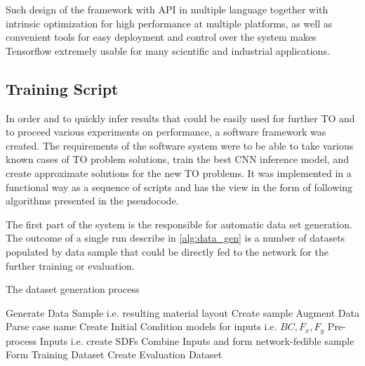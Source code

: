 Such design of the framework with API in multiple language together with intrinsic optimization for high performance at multiple platforms, as well as convenient tools for easy deployment and control over the system makes Tensorflow extremely usable for many scientific and industrial applications.

\subsection{Training Script}

In order and to quickly infer results that could be easily used for further TO and to proceed various experiments on performance, a software framework was created. 
The requirements of the software system were to be able to take various known cases of TO problem solutions, train the best CNN inference model, and create approximate solutions for the new TO problems.
It was implemented in a functional way as a sequence of scripts and has the view in the form of following algorithms presented in the pseudocode. 
\medskip

The first part of the system is the responsible for automatic data set generation.
The outcome of a single run describe in \ref{alg:data_gen} is a number of datasets populated by data sample that could be directly fed to the network for the further training or evaluation.

\begin{algorithm}
\caption{The dataset generation process}\label{alg:data_gen}
\begin{algorithmic}[0]
		\State Generate Data Sample i.e. resulting material layout
		\State Create sample
	\EndFor
		\State Augment Data
		\State Parse case name
		\State Create Initial Condition models for inputs i.e. $ BC,F_x,F_y $
		\State Pre-process Inputs i.e. create SDFs
		\State Combine Inputs and form network-fedible sample
	\EndFor
		\State Form Training Dataset
	\EndFor
	\State Create Evaluation Dataset
\end{algorithmic} 	
\end{algorithm}
\medskip
{}

